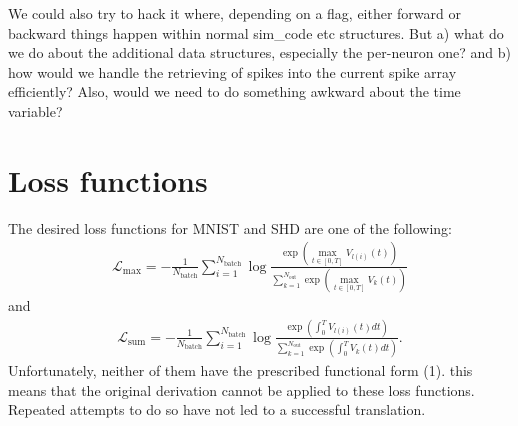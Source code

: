 \documentclass[a4paper]{article}
\newcommand{\blue}[1]{{\color{blue}#1}}
\begin{document}
  We could also try to hack it where, depending on a flag, either
  forward or backward things happen within normal sim\_code etc
  structures.  But a) what do we do about the additional data
  structures, especially the per-neuron one? and b) how would we
  handle the retrieving of spikes into the current spike array
  efficiently? Also, would we need to do something awkward about the
  time variable?

  \section{Loss functions}
  The desired loss functions for MNIST and SHD are one of the following:
  \begin{align}
    {\mathcal L}_{\text{max}} = - \frac{1}{N_{\text{batch}}} \sum_{i=1}^{N_{\text{batch}}} \log \frac{\exp\left(\max_{t \in [0, T]} V_{l(i)}(t)\right)}{\sum_{k=1}^{N_{\text{out}}}\exp\left(\max_{t \in [0, T]} V_{k}(t)\right)} \label{maxloss}
  \end{align}
  and
  \begin{align}
    {\mathcal L_{\text{sum}}} = - \frac{1}{N_{\text{batch}}} \sum_{i=1}^{N_{\text{batch}}} \log \frac{\exp\left(\int_0^T V_{l(i)}(t) dt\right)}{\sum_{k=1}^{N_{\text{out}}} \exp\left(\int_0^T V_{k}(t) dt\right)}. \label{sumloss}
  \end{align}
  Unfortunately, neither of them have the prescribed functional form \blue{(1)}.
  this means that the original derivation cannot be applied to these loss functions. Repeated attempts to do so have not led to a successful translation.
\end{document}
